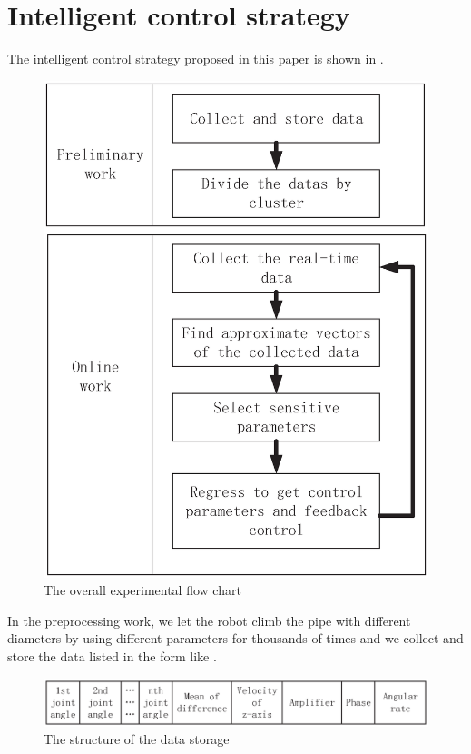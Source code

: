 \section{Intelligent control strategy}

The intelligent control strategy proposed in this paper is shown in .
\begin{figure}[H]
	\centering
	\includegraphics[width=.8\linewidth]{fig/mainwork/stepMap}
	\caption{The overall experimental flow chart}
\end{figure}

 In the preprocessing work, we let the robot climb the pipe with different diameters by using different parameters for thousands of times and we collect and store the data listed in the form like .
\begin{figure}[H]
	\centering
	\includegraphics[width=\linewidth]{fig/mainwork/data}
	\caption{The structure of the data storage}
\end{figure}


